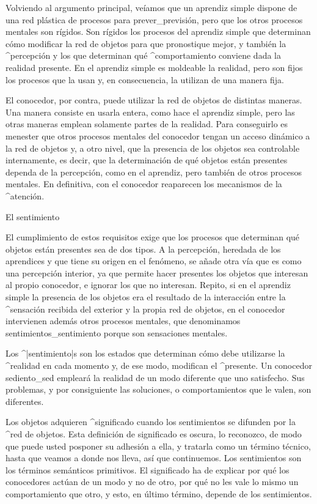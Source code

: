 Volviendo al argumento principal, veíamos que un aprendiz simple dispone
de una red plástica de procesos para prever_{previsión}, pero que los
otros procesos mentales son rígidos. Son rígidos los procesos del
aprendiz simple que determinan cómo modificar la red de objetos para que
pronostique mejor, y también la ^{percepción} y los que determinan qué
^{comportamiento} conviene dada la realidad presente. En el aprendiz
simple es moldeable la realidad, pero son fijos los procesos que la usan
y, en consecuencia, la utilizan de una manera fija.


El conocedor, por contra, puede utilizar la red de objetos de distintas
maneras. Una manera consiste en usarla entera, como hace el aprendiz
simple, pero las otras maneras emplean solamente partes de la realidad.
Para conseguirlo es menester que otros procesos mentales del conocedor
tengan un acceso dinámico a la red de objetos y, a otro nivel, que la
presencia de los objetos sea controlable internamente, es decir, que la
determinación de qué objetos están presentes dependa de la percepción,
como en el aprendiz, pero también de otros procesos mentales. En
definitiva, con el conocedor reaparecen los mecanismos de la
^{atención}.


\Section El sentimiento

El cumplimiento de estos requisitos exige que los procesos que
determinan qué objetos están presentes sea de dos tipos. A la
percepción, heredada de los aprendices y que tiene su origen en el
fenómeno, se añade otra vía que es como una percepción interior, ya que
permite hacer presentes los objetos que interesan al propio conocedor, e
ignorar los que no interesan. Repito, si en el aprendiz simple la
presencia de los objetos era el resultado de la interacción entre la
^{sensación} recibida del exterior y la propia red de objetos, en el
conocedor intervienen además otros procesos mentales, que denominamos
sentimientos_{sentimiento} porque son sensaciones mentales.

Los ^|sentimiento|s son los estados que determinan cómo debe utilizarse
la ^{realidad} en cada momento y, de ese modo, modifican el ^{presente}.
Un conocedor sediento_{sed} empleará la realidad de un modo diferente
que uno satisfecho. Sus problemas, y por consiguiente las soluciones, o
comportamientos que le valen, son diferentes.

Los objetos adquieren ^{significado} cuando los sentimientos se difunden
por la ^{red de objetos}. Esta definición de significado es oscura, lo
reconozco, de modo que puede usted posponer su adhesión a ella, y
tratarla como un término técnico, hasta que veamos a donde nos lleva,
así que continuemos. Los sentimientos son los términos semánticos
primitivos. El significado ha de explicar por qué los conocedores actúan
de un modo y no de otro, por qué no les vale lo mismo un comportamiento
que otro, y esto, en último término, depende de los sentimientos.

